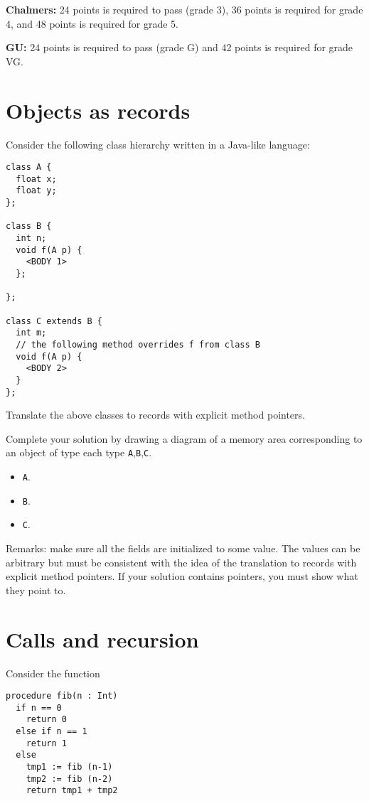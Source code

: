 \documentclass{article}
\newcommand{\answer}[1]{}
\begin{document}
\textbf{Chalmers:}
24 points is required to pass (grade 3), 36 points is required for
grade 4, and 48 points is required for grade 5.

\textbf{GU:}
24 points is required to pass (grade G) and 42 points is
required for grade VG.

\section{Objects as records}

Consider the following class hierarchy written in a Java-like
language:
\begin{verbatim}
class A {
  float x;
  float y;
};

class B {
  int n;
  void f(A p) {
    <BODY 1>
  };

};

class C extends B {
  int m;
  // the following method overrides f from class B
  void f(A p) { 
    <BODY 2>
  }
};
\end{verbatim}

Translate the above classes to records with explicit method pointers. 

Complete your solution by drawing a diagram of a memory area
corresponding to an object of type each type \texttt A,\texttt B,\texttt C.
\begin{itemize}
\item \texttt A. 
\item \texttt B. 
\item \texttt C. 
\end{itemize}
Remarks: make sure all the fields are initialized to some value. The
values can be arbitrary but must be consistent with the idea of the
translation to records with explicit method pointers. If your solution
contains pointers, you must show what they point to.

\answer{
\begin{verbatim}
    struct A {
      float x = 0
      float y = 0
    }
    struct B {
      int n = 0
      void* f(B* this, A* p) = <BODY1>;
    }
    struct C {
      int n = 0
      void* f(C* this, A* p) = <BODY2>;
      int m;
    }
\end{verbatim}
}


\newpage
\section{Calls and recursion}
Consider the function
\begin{verbatim}
procedure fib(n : Int)
  if n == 0
    return 0
  else if n == 1
    return 1
  else 
    tmp1 := fib (n-1)
    tmp2 := fib (n-2)
    return tmp1 + tmp2
\end{verbatim}
\end{document}
